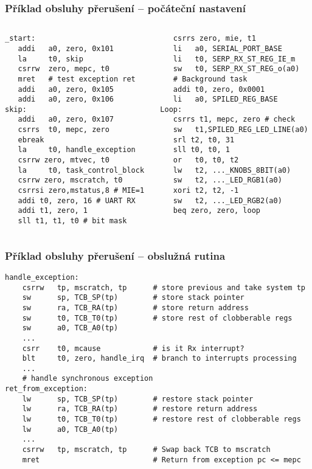 \documentclass{beamer}
\begin{document}
\begin{frame}[fragile]
\frametitle{Příklad obsluhy přerušení -- počáteční nastavení}

\begin{columns}
\begin{column}{0.5\textwidth}
\begin{verbatim}
_start:
   addi   a0, zero, 0x101
   la     t0, skip
   csrrw  zero, mepc, t0
   mret   # test exception ret
   addi   a0, zero, 0x105
   addi   a0, zero, 0x106
skip:
   addi   a0, zero, 0x107
   csrrs  t0, mepc, zero
   ebreak
   la     t0, handle_exception
   csrrw zero, mtvec, t0
   la     t0, task_control_block
   csrrw zero, mscratch, t0
   csrrsi zero,mstatus,8 # MIE=1
   addi t0, zero, 16 # UART RX
   addi t1, zero, 1
   sll t1, t1, t0 # bit mask
\end{verbatim}
\end{column}
\begin{column}{0.5\textwidth}
\begin{verbatim}
   csrrs zero, mie, t1
   li   a0, SERIAL_PORT_BASE
   li   t0, SERP_RX_ST_REG_IE_m
   sw   t0, SERP_RX_ST_REG_o(a0)
   # Background task
   addi t0, zero, 0x0001
   li   a0, SPILED_REG_BASE
Loop:
   csrrs t1, mepc, zero # check
   sw   t1,SPILED_REG_LED_LINE(a0)
   srl t2, t0, 31
   sll t0, t0, 1
   or   t0, t0, t2
   lw   t2, ..._KNOBS_8BIT(a0)
   sw   t2, ..._LED_RGB1(a0)
   xori t2, t2, -1
   sw   t2, ..._LED_RGB2(a0)
   beq zero, zero, loop
\end{verbatim}
\end{column}
\end{columns}

\end{frame}

\begin{frame}[fragile]
\frametitle{Příklad obsluhy přerušení -- obslužná rutina}

\begin{verbatim}
handle_exception:
    csrrw   tp, mscratch, tp      # store previous and take system tp
    sw      sp, TCB_SP(tp)        # store stack pointer
    sw      ra, TCB_RA(tp)        # store return address
    sw      t0, TCB_T0(tp)        # store rest of clobberable regs
    sw      a0, TCB_A0(tp)
    ...
    csrr    t0, mcause            # is it Rx interrupt?
    blt     t0, zero, handle_irq  # branch to interrupts processing
    ...
    # handle synchronous exception
ret_from_exception:
    lw      sp, TCB_SP(tp)        # restore stack pointer
    lw      ra, TCB_RA(tp)        # restore return address
    lw      t0, TCB_T0(tp)        # restore rest of clobberable regs
    lw      a0, TCB_A0(tp)
    ...
    csrrw   tp, mscratch, tp      # Swap back TCB to mscratch
    mret                          # Return from exception pc <= mepc
\end{verbatim}
\end{frame}
\end{document}
